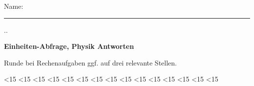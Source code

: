 \documentclass{./units4school}
\begin{document}
Name: \rule[-.4ex]{7cm}{.4pt}\hfill%
\the\day.\the\month.\the\year%
\hspace*{.5cm}%


\vspace{6mm}
\textbf{\large Einheiten-Abfrage, Physik \ifprintanswers \hfill \textcolor{AccentColor}{Antworten}\fi}
\vspace{3mm}

Runde bei Rechenaufgaben ggf. auf drei relevante Stellen.


\ifnum\theexerciseID<15 {} \fi
\ifnum\theexerciseID<15 {} \fi
\ifnum\theexerciseID<15 {} \fi
\ifnum\theexerciseID<15 {} \fi
\ifnum\theexerciseID<15 {} \fi
\ifnum\theexerciseID<15 {} \fi
\ifnum\theexerciseID<15 {} \fi
\ifnum\theexerciseID<15 {} \fi
\ifnum\theexerciseID<15 {} \fi
\ifnum\theexerciseID<15 {} \fi
\ifnum\theexerciseID<15 {} \fi
\ifnum\theexerciseID<15 {} \fi
\ifnum\theexerciseID<15 {} \fi
\ifnum\theexerciseID<15 {} \fi
\ifnum\theexerciseID<15 {} \fi
%
\end{document}
